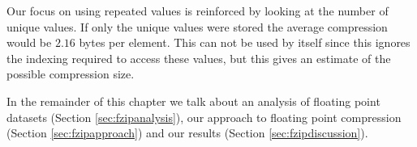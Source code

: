 \indent Our focus on using repeated values is reinforced by looking at the number of unique values. If only the unique values were stored the average compression would be $2.16$ bytes per element. This can not be used by itself since this ignores the indexing required to access these values, but this gives an estimate of the possible compression size.\par
In the remainder of this chapter we talk about an analysis of floating point datasets (Section \ref{sec:fzipanalysis}), our approach to floating point compression (Section \ref{sec:fzipapproach}) and our results (Section \ref{sec:fzipdiscussion}).
\begin{figure}
\center
{}
\end{figure}
